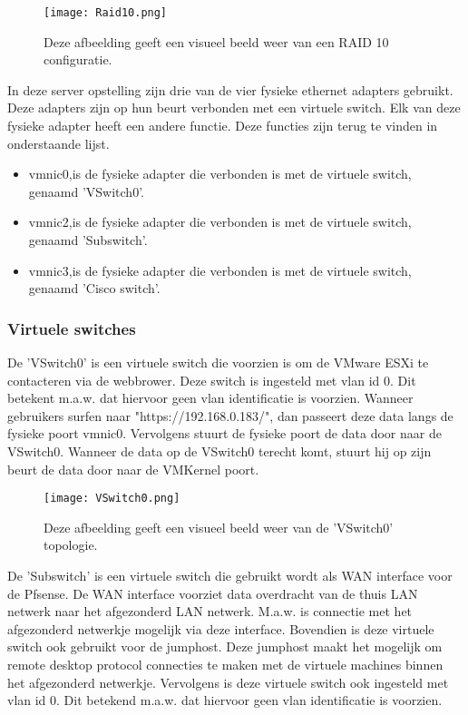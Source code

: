 \begin{figure}[H]
	\centering
	\texttt{[image: Raid10.png]}
	\caption{Deze afbeelding geeft een visueel beeld weer van een RAID 10 configuratie.}
\end{figure}

In deze server opstelling zijn drie van de vier fysieke ethernet adapters gebruikt. Deze adapters zijn op hun beurt verbonden met een virtuele switch. Elk van deze fysieke adapter heeft een andere functie. Deze functies zijn terug te vinden in onderstaande lijst. 

\begin{itemize}
	\item vmnic0,is de fysieke adapter die verbonden is met de virtuele switch, genaamd 'VSwitch0'.
	\item vmnic2,is de fysieke adapter die verbonden is met de virtuele switch, genaamd 'Sub\textunderscore switch'.
	\item vmnic3,is de fysieke adapter die verbonden is met de virtuele switch, genaamd 'Cisco \textunderscore switch'.
\end{itemize}

\newpage
\subsubsection{Virtuele switches}
\newline
De 'VSwitch0' is een virtuele switch die voorzien is om de VMware ESXi te contacteren via de webbrower. Deze switch is ingesteld met vlan id 0. Dit betekent m.a.w. dat hiervoor geen vlan identificatie is voorzien. 
\newline
\newline
Wanneer gebruikers surfen naar "https://192.168.0.183/", dan passeert deze data langs de fysieke poort vmnic0. Vervolgens stuurt de fysieke poort de data door naar de VSwitch0. Wanneer de data op de VSwitch0 terecht komt, stuurt hij op zijn beurt de data door naar de VMKernel poort.

\begin{figure}[H]
	\centering
	\texttt{[image: VSwitch0.png]}
	\caption{Deze afbeelding geeft een visueel beeld weer van de 'VSwitch0' topologie.}
\end{figure}

\newline
De 'Sub\textunderscore switch' is een virtuele switch die gebruikt wordt als WAN interface voor de Pfsense. De WAN interface voorziet data overdracht van de thuis LAN netwerk naar het afgezonderd LAN netwerk. M.a.w. is connectie met het afgezonderd netwerkje mogelijk via deze interface. Bovendien is deze virtuele switch ook gebruikt voor de jumphost. Deze jumphost maakt het mogelijk om remote desktop protocol connecties te maken met de virtuele machines binnen het afgezonderd netwerkje. 
\newline
\newline
Vervolgens is deze virtuele switch ook ingesteld met vlan id 0. Dit betekend m.a.w. dat hiervoor geen vlan identificatie is voorzien. 

